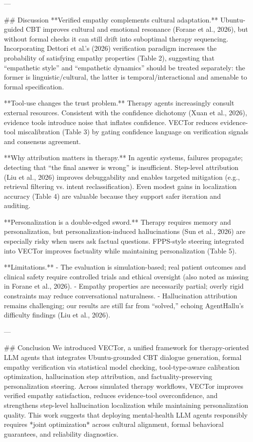---

## Discussion  
**Verified empathy complements cultural adaptation.** Ubuntu-guided CBT improves cultural and emotional resonance (Forane et al., 2026), but without formal checks it can still drift into suboptimal therapy sequencing. Incorporating Dettori et al.’s (2026) verification paradigm increases the probability of satisfying empathy properties (Table 2), suggesting that “empathetic style” and “empathetic dynamics” should be treated separately: the former is linguistic/cultural, the latter is temporal/interactional and amenable to formal specification.

**Tool-use changes the trust problem.** Therapy agents increasingly consult external resources. Consistent with the confidence dichotomy (Xuan et al., 2026), evidence tools introduce noise that inflates confidence. VECTor reduces evidence-tool miscalibration (Table 3) by gating confidence language on verification signals and consensus agreement.

**Why attribution matters in therapy.** In agentic systems, failures propagate; detecting that “the final answer is wrong” is insufficient. Step-level attribution (Liu et al., 2026) improves debuggability and enables targeted mitigation (e.g., retrieval filtering vs. intent reclassification). Even modest gains in localization accuracy (Table 4) are valuable because they support safer iteration and auditing.

**Personalization is a double-edged sword.** Therapy requires memory and personalization, but personalization-induced hallucinations (Sun et al., 2026) are especially risky when users ask factual questions. FPPS-style steering integrated into VECTor improves factuality while maintaining personalization (Table 5).

**Limitations.**  
- The evaluation is simulation-based; real patient outcomes and clinical safety require controlled trials and ethical oversight (also noted as missing in Forane et al., 2026).  
- Empathy properties are necessarily partial; overly rigid constraints may reduce conversational naturalness.  
- Hallucination attribution remains challenging; our results are still far from “solved,” echoing AgentHallu’s difficulty findings (Liu et al., 2026).

---

## Conclusion  
We introduced VECTor, a unified framework for therapy-oriented LLM agents that integrates Ubuntu-grounded CBT dialogue generation, formal empathy verification via statistical model checking, tool-type-aware calibration optimization, hallucination step attribution, and factuality-preserving personalization steering. Across simulated therapy workflows, VECTor improves verified empathy satisfaction, reduces evidence-tool overconfidence, and strengthens step-level hallucination localization while maintaining personalization quality. This work suggests that deploying mental-health LLM agents responsibly requires *joint optimization* across cultural alignment, formal behavioral guarantees, and reliability diagnostics.

